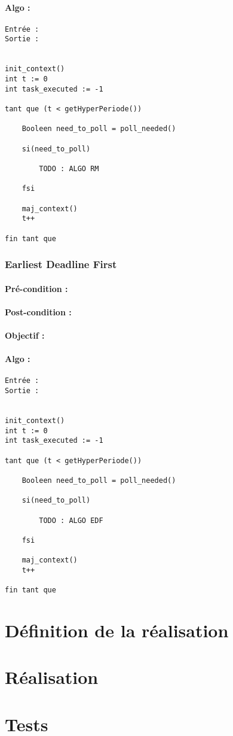 				\paragraph{Algo :} 
					\begin{verbatim}
Entrée : 
Sortie :  


init_context()
int t := 0
int task_executed := -1

tant que (t < getHyperPeriode())
	
    Booleen need_to_poll = poll_needed()
	
    si(need_to_poll)
        
        TODO : ALGO RM
        
    fsi
	
    maj_context()
    t++
	
fin tant que
					\end{verbatim}
					
					
			\subsubsection{Earliest Deadline First}
			
				\paragraph{Pré-condition :} 
				\paragraph{Post-condition :} 
				\paragraph{Objectif :} 
				\paragraph{Algo :} 
					\begin{verbatim}
Entrée : 
Sortie :  


init_context()
int t := 0
int task_executed := -1

tant que (t < getHyperPeriode())
	
	Booleen need_to_poll = poll_needed()
	
	si(need_to_poll)
		
		TODO : ALGO EDF
		
	fsi
	
	maj_context()
	t++
	
fin tant que
					\end{verbatim}
				

	\section{Définition de la réalisation}

	\section{Réalisation}

	\section{Tests}

